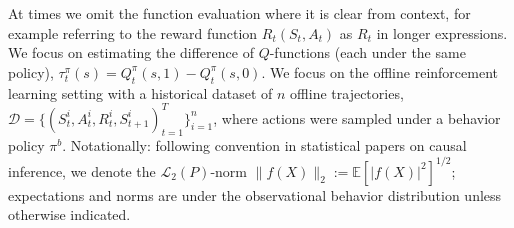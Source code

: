 \documentclass[opre,nonblindrev]{informs4}
\newcommand{\norm}[1]{\lVert#1\rVert}
\newcommand{\blipadv}{\tau}
\begin{document}
At times we omit the function evaluation where it is clear from context, for example referring to the reward function $R_t(S_t,A_t)$ as $R_t$ in longer expressions. 
We focus on estimating the difference of $Q$-functions (each under the same policy), $\blipadv_t^\pi(s) =Q_t^\pi(s,1) - Q_t^\pi(s,0).$ 
We focus on the offline reinforcement learning setting with a historical dataset of $n$ offline trajectories, $\textstyle \mathcal{D}=\{(S_t^{i}, A_t^{i}, R_t^{i},S_{t+1}^{i})_{t=1}^{T}\}_{i=1}^n$, where actions were sampled under a behavior policy $\pi^b.$ %
Notationally: following convention in statistical papers on causal inference, we denote the $\mathcal{L}_2(P)$-norm $\norm{f(X)}_2:=\mathbb{E}[ |f(X)|^2 ]^{1 / 2}$; expectations and norms are under the observational behavior distribution unless otherwise indicated.%
\end{document}
